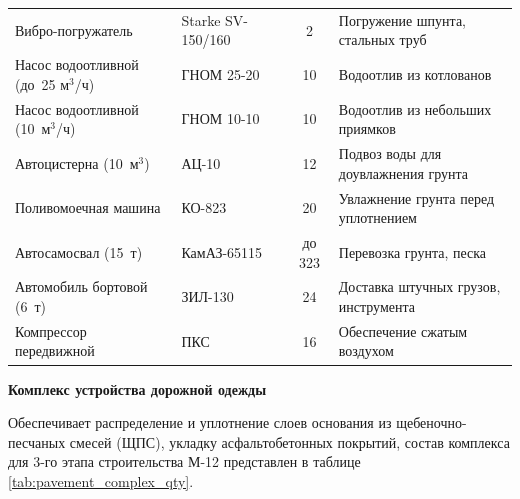 \begin{longtable}{|>{\raggedright\arraybackslash}p{3.8cm}|>{\raggedright\arraybackslash}p{3.2cm}|c|>{\raggedright\arraybackslash}p{5.0cm}|}
	Вибро-погружатель & Starke SV-150/160 & 2 & Погружение шпунта, стальных труб \\
	Насос водоотливной (до~25 м\(^3\)/ч) & ГНОМ 25-20 & 10 & Водоотлив из котлованов \\
	Насос водоотливной (10~м\(^3\)/ч) & ГНОМ 10-10 & 10 & Водоотлив из небольших приямков \\
	Автоцистерна (10~м\(^3\)) & АЦ-10 & 12 & Подвоз воды для доувлажнения грунта \\
	Поливомоечная машина & КО-823 & 20 & Увлажнение грунта перед уплотнением \\
	Автосамосвал (15~т) & КамАЗ-65115 & до 323 & Перевозка грунта, песка \\
	Автомобиль бортовой (6~т) & ЗИЛ-130 & 24 & Доставка штучных грузов, инструмента \\
	Компрессор передвижной & ПКС & 16 & Обеспечение сжатым воздухом \\
\end{longtable}

\textbf{Комплекс устройства дорожной одежды}

Обеспечивает распределение и уплотнение слоев основания из щебеночно-песчаных смесей (ЩПС), укладку асфальтобетонных покрытий, состав комплекса для 3-го этапа строительства М-12 представлен в таблице \ref{tab:pavement_complex_qty}.

